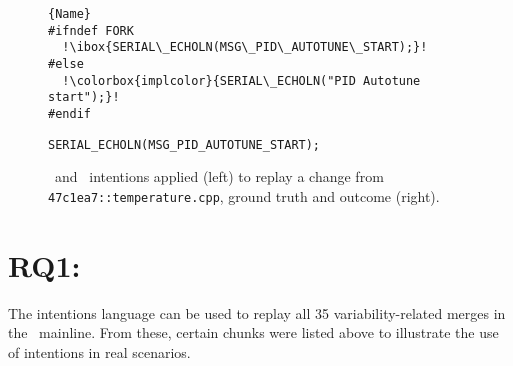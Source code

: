 \begin{figure}[ht]
    \centering
    \begin{minipage}{.50\textwidth}
\begin{lstlisting}[caption=Wrapped code by PC,escapechar=!]{Name}
#ifndef FORK
  !\ibox{SERIAL\_ECHOLN(MSG\_PID\_AUTOTUNE\_START);}!
#else
  !\colorbox{implcolor}{SERIAL\_ECHOLN("PID Autotune start");}!
#endif
\end{lstlisting}
\end{minipage}\qquad
\begin{minipage}{.55\textwidth}
\begin{lstlisting}
SERIAL_ECHOLN(MSG_PID_AUTOTUNE_START);
\end{lstlisting}

    \end{minipage}
    \caption{\colorbox{shadecolor}{\keep}~and \colorbox{implcolor}{\remove}~intentions applied (left) to replay a change from \texttt{47c1ea7::temperature.cpp}, ground truth and outcome (right).}
    \label{fig:keep-remove}
\end{figure}

\section{RQ1: \RQA}
The intentions language can be used to replay all 35 variability-related merges in the \marlin~mainline. From these, certain chunks were listed above to illustrate the use of intentions in real scenarios. 


